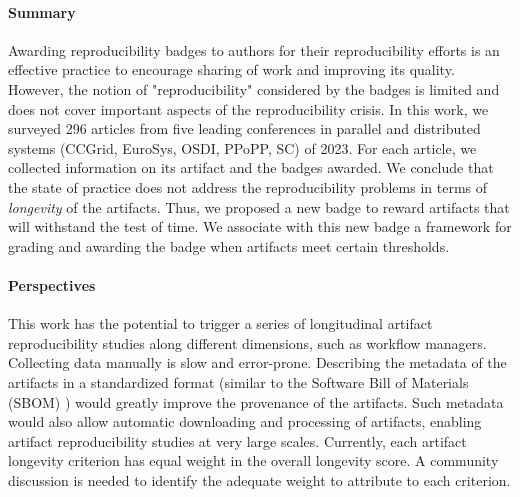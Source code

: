\documentclass[sigconf,natbib=false]{acmart}
\newcommand{\eg}{\emph{e.g.,}}
\begin{document}
\paragraph{Summary}

Awarding reproducibility badges to authors for their reproducibility efforts is an effective practice to encourage sharing of work and improving its quality.
However, the notion of "reproducibility" considered by the badges is limited and does not cover important aspects of the reproducibility crisis.
In this work, we surveyed 296 articles from five leading conferences in parallel and distributed systems (CCGrid, EuroSys, OSDI, PPoPP, SC) of 2023.
For each article, we collected information on its artifact and the badges awarded.
We conclude that the state of practice does not address the reproducibility problems in terms of \emph{longevity} of the artifacts.
Thus, we proposed a new badge to reward artifacts that will withstand the test of time.
We associate with this new badge a framework for grading and awarding the badge when artifacts meet certain thresholds.

\paragraph{Perspectives}

This work has the potential to trigger a series of longitudinal artifact reproducibility studies along different dimensions, such as workflow managers.
Collecting data manually is slow and error-prone.
Describing the metadata of the artifacts in a standardized format (similar to the Software Bill of Materials (SBOM) \cite{sbom, xia2023empirical}) would greatly improve the provenance of the artifacts.
Such metadata would also allow automatic downloading and processing of artifacts, enabling artifact reproducibility studies at very large scales.
Currently, each artifact longevity criterion has equal weight in the overall longevity score. 
A community discussion is needed to identify the adequate weight to attribute to each criterion. 
\end{document}

